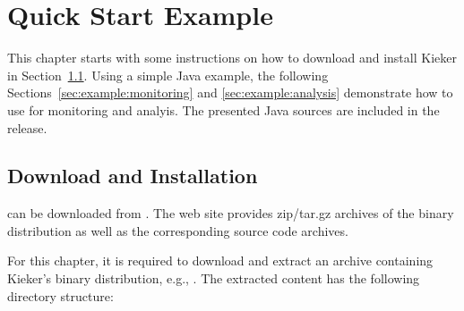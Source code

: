 \chapter{Quick Start Example}
This chapter starts with some instructions on how to download and install Kieker %
in Section~\ref{sec:example:downloadInstall}. %
Using a simple Java example, the following Sections~\ref{sec:example:monitoring} %
and \ref{sec:example:analysis} demonstrate how to use \Kieker{} for monitoring %
and analyis. %
\notify The presented Java sources are included in the \Kieker{} release.

\section{Download and Installation}\label{sec:example:downloadInstall}

\Kieker{} can be downloaded from \KiekerURL. The web %
site provides zip/tar.gz archives of the \Kieker{} binary distribution as well %
as the corresponding \Kieker{} source code archives.

For this chapter, it is required to download and extract an archive containing %
Kieker's binary distribution, e.g., .
The extracted content has the following directory structure:


\renewcommand*\DTstylecomment{\sffamily}

\vspace{1ex}


